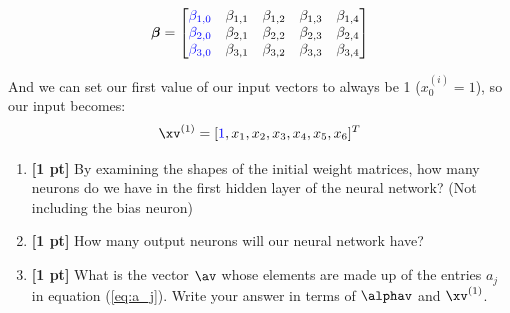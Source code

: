 \begin{enumerate}
$$\boldsymbol{\beta}=
    \begin{bmatrix}
    \textcolor{blue}{\beta_{1,0}} & \beta_{1,1} & \beta_{1,2} & \beta_{1,3} & \beta_{1,4} \\
    \textcolor{blue}{\beta_{2,0}} & \beta_{2,1} & \beta_{2,2} & \beta_{2,3} & \beta_{2,4} \\
    \textcolor{blue}{\beta_{3,0}} & \beta_{3,1} & \beta_{3,2} & \beta_{3,3} & \beta_{3,4}
    \end{bmatrix}$$

    And we can set our first value of our input vectors to always be 1 ($x_0^{(i)} = 1$), so our input becomes: $$\xv^{(1)}=[\textcolor{blue}{1},x_1,x_2,x_3,x_4,x_5,x_6]^T$$
    
    
    \begin{enumerate}
        \item \textbf{[1 pt]} By examining the shapes of the initial weight matrices, how many neurons do we have in the first hidden layer of the neural network? (Not including the bias neuron)
        
        \begin{tcolorbox}[fit,height=1cm, width=2cm, blank, borderline={1pt}{-2pt}]
        \end{tcolorbox}
        
        
        
        
        \item \textbf{[1 pt]} How many output neurons will our neural network have?
        
        \begin{tcolorbox}[fit,height=1cm, width=2cm, blank, borderline={1pt}{-2pt}]
        \end{tcolorbox}
        

        
        
        
        
        \item \textbf{[1 pt]} What is the vector $\av$ whose elements are made up of the entries $a_j$ in equation (\ref{eq:a_j}). Write your answer in terms of $\alphav$ and $\xv^{(1)}$.
        
        
        \begin{tcolorbox}[fit,height=1cm, width=4cm, blank, borderline={1pt}{-2pt}]
        \end{tcolorbox}
        

        
        

\end{enumerate}
\end{enumerate}

